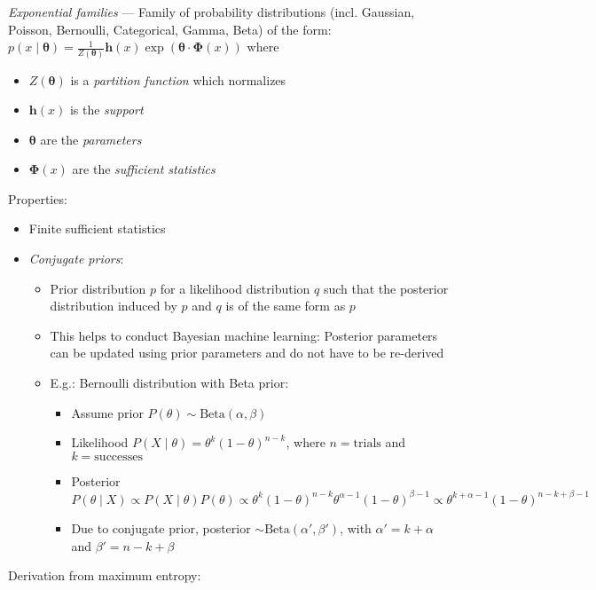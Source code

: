 \emph{Exponential families} ---  Family of probability distributions (incl. Gaussian, Poisson, Bernoulli, Categorical, Gamma, Beta) of the form: $ p(x \mid \boldsymbol{\theta}) = \frac{1}{Z(\boldsymbol{\theta})} \boldsymbol{h}(x) \exp\left(\boldsymbol{\theta} \cdot \boldsymbol{\Phi}(x)\right) $ where
\begin{itemize}
    \item $Z(\boldsymbol{\theta})$ is a \emph{partition function} which normalizes
    \item $\boldsymbol{h}(x)$ is the \emph{support}
    \item $\boldsymbol{\theta}$ are the \emph{parameters}
    \item $\boldsymbol{\Phi}(x)$ are the \emph{sufficient statistics}
\end{itemize}
Properties:
\begin{itemize}
    \item Finite sufficient statistics
    \item \emph{Conjugate priors}:
    \begin{itemize}
        \item Prior distribution $p$ for a likelihood distribution $q$ such that the posterior distribution induced by $p$ and $q$ is of the same form as $p$
        \item This helps to conduct Bayesian machine learning: Posterior parameters can be updated using prior parameters and do not have to be re-derived
        \item E.g.: Bernoulli distribution with Beta prior:
        \begin{itemize}
            \item Assume prior $P(\theta) \sim \textrm{Beta}(\alpha, \beta)$
            \item Likelihood $P(X \mid \theta) = \theta^k (1 - \theta)^{n-k}$, where $n = \textrm{trials}$ and $k = \textrm{successes}$
            \item Posterior $P(\theta \mid X) \propto P(X \mid \theta) P(\theta) \propto \theta^k (1 - \theta)^{n-k} \theta^{\alpha-1} (1 - \theta)^{\beta-1} \propto \theta^{k + \alpha - 1} (1 - \theta)^{n - k + \beta - 1}$
            \item Due to conjugate prior, posterior $\sim \textrm{Beta}(\alpha', \beta')$, with $\alpha' = k + \alpha$ and $\beta' = n - k + \beta$
        \end{itemize}
    \end{itemize}
\end{itemize}
Derivation from maximum entropy:

